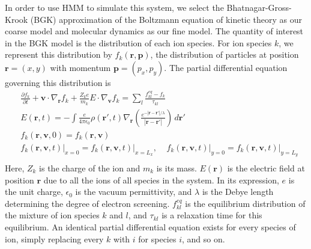 \documentclass{article}
\begin{document}
In order to use HMM to simulate this system, we select the Bhatnagar-Gross-Krook (BGK) approximation of the Boltzmann equation of kinetic theory as our coarse model and molecular dynamics as our fine model. The quantity of interest in the BGK model is the distribution of each ion species. For ion species $k$, we represent this distribution by $f_k(\mathbf{r},\mathbf{p})$, the distribution of particles at position $\mathbf{r}=(x,y)$ with momentum $\mathbf{p}=(p_x,p_y)$. The partial differential equation governing this distribution is
\begin{equation}
\begin{split}
&\frac{\partial f_k}{\partial t}+\mathbf{v}\cdot\nabla_\mathbf{r}f_k+\frac{Z_ke}{m_k}E\cdot\nabla_\mathbf{v}f_k=\sum_l\frac{f_{kl}^{eq}-f_k}{\tau_{kl}}\\
&E(\mathbf{r},t)=-\int\frac{e}{4\pi\epsilon_0}\rho(\mathbf{r}',t)\nabla_\mathbf{r}\left(\frac{e^{-|\mathbf{r}-\mathbf{r}'|/\lambda}}{|\mathbf{r}-\mathbf{r}'|}\right)\,d\mathbf{r}'\\
&f_k(\mathbf{r},\mathbf{v},0)=f_{k}(\mathbf{r},\mathbf{v})\\
&\left.f_k(\mathbf{r},\mathbf{v},t)\right|_{x=0}=\left.f_{k}(\mathbf{r},\mathbf{v},t)\right|_{x=L_x},\;\;\;\;
\left.f_k(\mathbf{r},\mathbf{v},t)\right|_{y=0}=\left.f_{k}(\mathbf{r},\mathbf{v},t)\right|_{y=L_y}\\
\end{split}
\label{eq:BGK}
\end{equation}Here, $Z_k$ is the charge of the ion and $m_k$ is its mass. $E(\mathbf{r})$ is the electric field at position $\mathbf{r}$ due to all the ions of all species in the system. In its expression, $e$ is the unit charge, $\epsilon_0$ is the vacuum permittivity, and $\lambda$ is the Debye length determining the degree of electron screening. $f_{kl}^{eq}$ is the equilibrium distribution of the mixture of ion species $k$ and $l$, and $\tau_{kl}$ is a relaxation time for this equilibrium. An identical partial differential equation exists for every species of ion, simply replacing every $k$ with $i$ for species $i$, and so on.
\end{document}
